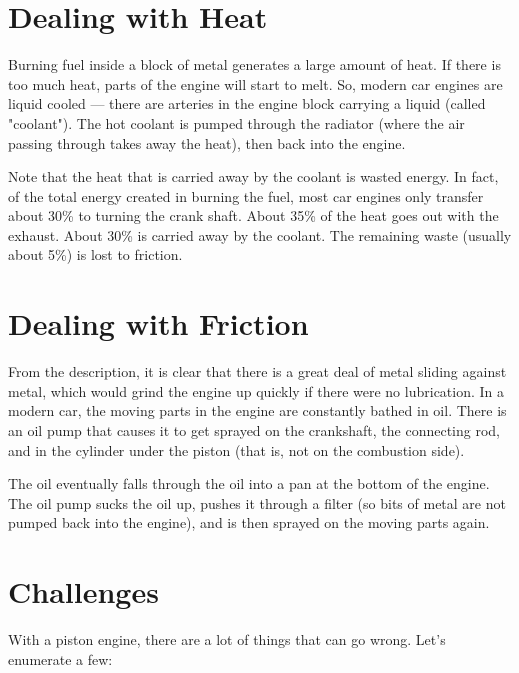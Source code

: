 \section{Dealing with Heat}
Burning fuel inside a block of metal generates a large amount of heat. If there is too much heat, parts of the engine will start to melt. So, modern car engines are liquid cooled --- there are arteries in the engine block carrying a liquid (called "coolant"). The hot coolant is pumped through the radiator (where the air passing through takes away the heat), then back into the engine.

Note that the heat that is carried away by the coolant is wasted energy.  In fact, of the total energy created in burning the fuel, most car engines only transfer about 30\% to turning the crank shaft. About 35\% of the heat goes out with the exhaust. About 30\% is carried away by the coolant. 
The remaining waste (usually about 5\%) is lost to friction.

\section{Dealing with Friction}
From the description, it is clear that there is a great deal of metal sliding against metal, which would grind the engine up quickly if there were no lubrication. In a modern car, the moving parts in the engine are constantly bathed in oil. There is an oil pump that causes it to get sprayed on the crankshaft, the connecting rod, and in the cylinder under the piston (that is, not on the combustion side). 

The oil eventually falls through the oil into a pan at the bottom of the engine.  The oil pump sucks the oil up, pushes it through a filter (so bits of metal are not pumped back into the engine), and is then sprayed on the moving parts again.

\section{Challenges}
With a piston engine, there are a lot of things that can go wrong. Let's enumerate a few:

